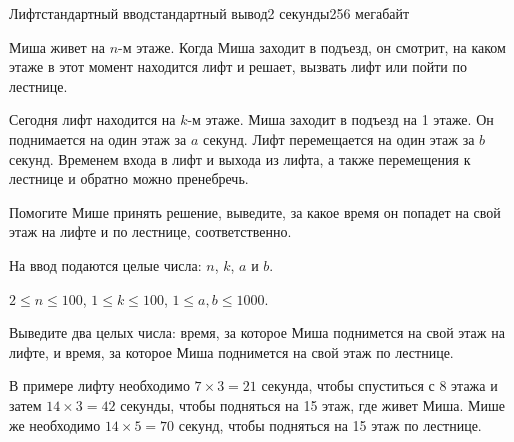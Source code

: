 \begin{problem}{Лифт}{стандартный ввод}{стандартный вывод}{2 секунды}{256 мегабайт}

Миша живет на $n$-м этаже. Когда Миша заходит в подъезд, он смотрит, на каком этаже 
в этот момент находится лифт и решает, вызвать лифт или пойти по лестнице. 

Сегодня лифт находится на $k$-м этаже.
Миша заходит в подъезд на 1 этаже.
Он поднимается на один этаж за $a$ секунд. Лифт перемещается на один этаж за $b$
секунд. Временем входа в лифт и выхода из лифта, а также перемещения к лестнице и обратно
можно пренебречь.

Помогите Мише принять решение, выведите, за какое время он попадет на свой этаж
на лифте и по лестнице, соответственно.

\InputFile
На ввод подаются целые числа: $n$, $k$, $a$ и $b$.

$2 \le n \le 100$, $1 \le k \le 100$, $1 \le a, b \le 1000$.

\OutputFile
Выведите два целых числа: время, за которое Миша поднимется на свой этаж на лифте,
и время, за которое Миша поднимется на свой этаж по лестнице.

\Example

\begin{example}%
%
\end{example}

\Explanation

В примере лифту необходимо $7\times 3=21$ секунда, чтобы спуститься с 8 этажа
и затем $14\times 3=42$ секунды, чтобы подняться на 15 этаж, где живет Миша.
Мише же необходимо $14\times 5 = 70$ секунд, чтобы подняться на 15 этаж по лестнице.

\end{problem}
